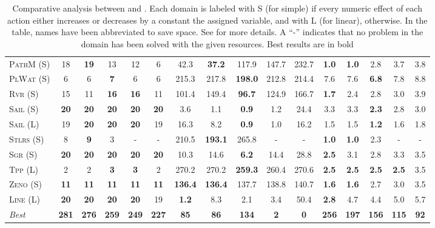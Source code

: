 \documentclass[11pt,landscape]{article}
\begin{document}
\begin{table*}[tb]
{\begin{tabular}{|l||ccccc||ccccc||ccccc||}
\textsc{PathM} (S)&18&\textbf{19}&13&12&6&42.3&\textbf{37.2}&117.9&147.7&232.7&\textbf{1.0}&\textbf{1.0}&2.8&3.7&3.8\\
\textsc{PlWat} (S)&6&6&\textbf{7}&6&6&215.3&217.8&\textbf{198.0}&212.8&214.4&7.6&7.6&\textbf{6.8}&7.8&8.8\\
\textsc{Rvr} (S)&15&11&\textbf{16}&\textbf{16}&11&101.4&149.4&\textbf{96.7}&124.9&166.7&\textbf{1.7}&2.4&2.8&3.0&3.9\\
\textsc{Sail} (S)&\textbf{20}&\textbf{20}&\textbf{20}&\textbf{20}&\textbf{20}&3.6&1.1&\textbf{0.9}&1.2&24.4&3.3&3.3&\textbf{2.3}&2.8&3.0\\
\textsc{Sail} (L)&19&\textbf{20}&\textbf{20}&\textbf{20}&19&16.3&8.2&\textbf{0.9}&1.0&16.2&1.5&1.5&\textbf{1.2}&1.6&1.8\\
\textsc{Stlrs} (S)&8&\textbf{9}&3&-&-&210.5&\textbf{193.1}&265.8&-&-&\textbf{1.0}&\textbf{1.0}&2.3&-&-\\
\textsc{Sgr} (S)&\textbf{20}&\textbf{20}&\textbf{20}&\textbf{20}&\textbf{20}&10.3&14.6&\textbf{6.2}&14.4&28.8&\textbf{2.5}&3.1&2.8&3.3&3.5\\
\textsc{Tpp} (L)&2&2&\textbf{3}&\textbf{3}&2&270.2&270.2&\textbf{259.3}&260.4&270.6&\textbf{2.5}&\textbf{2.5}&\textbf{2.5}&\textbf{2.5}&3.5\\
\textsc{Zeno} (S)&\textbf{11}&\textbf{11}&\textbf{11}&\textbf{11}&\textbf{11}&\textbf{136.4}&\textbf{136.4}&137.7&138.8&140.7&\textbf{1.6}&\textbf{1.6}&2.7&3.0&3.5\\
\textsc{Line} (L)&\textbf{20}&\textbf{20}&\textbf{20}&\textbf{20}&19&\textbf{1.2}&8.3&2.1&3.4&50.4&\textbf{2.8}&4.7&4.4&5.0&5.7
\\\hline
\textit{Best}&\textbf{281}&\textbf{276}&\textbf{259}&\textbf{249}&\textbf{227}&\textbf{85}&\textbf{86}&\textbf{134}&\textbf{2}&\textbf{0}&\textbf{256}&\textbf{197}&\textbf{156}&\textbf{115}&\textbf{92}\\\hline

        \end{tabular}}
        \caption{Comparative analysis between  \pattya and \pattye. Each domain is labeled with S (for simple) if every numeric effect of each action either increases or decreases by a constant the assigned variable, and with L (for linear), otherwise. In the table, names have been abbreviated to save space.  See \cite{ipc2023} for more details. A ``-'' indicates that no problem in the domain has been solved with the given resources. Best results are in bold}
        \label{tab:exp-patty-a-patty-e}
        \end{table*}
        
\end{document}
